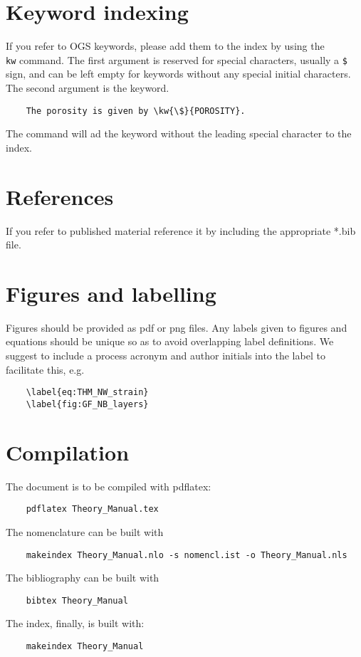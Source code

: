 \section{Keyword indexing}
If you refer to OGS keywords, please add them to the index by using the \texttt{\\kw} command. The first argument is reserved for special characters, usually a \texttt{\$} sign, and can be left empty for keywords without any special initial characters. The second argument is the keyword.
\begin{verbatim}
	The porosity is given by \kw{\$}{POROSITY}. 
\end{verbatim}
The command will ad the keyword without the leading special character to the index.

\section{References}
If you refer to published material reference it by including the appropriate *.bib file.

\section{Figures and labelling}
Figures should be provided as pdf or png files. Any labels given to figures and equations should be unique so as to avoid overlapping label definitions. We suggest to include a process acronym and author initials into the label to facilitate this, e.g.
\begin{verbatim}
	\label{eq:THM_NW_strain}
	\label{fig:GF_NB_layers}
\end{verbatim}

\section{Compilation}
The document is to be compiled with pdflatex:
\begin{verbatim}
	pdflatex Theory_Manual.tex
\end{verbatim}
The nomenclature can be built with
\begin{verbatim}
	makeindex Theory_Manual.nlo -s nomencl.ist -o Theory_Manual.nls
\end{verbatim}
The bibliography can be built with 
\begin{verbatim}
	bibtex Theory_Manual
\end{verbatim}
The index, finally, is built with:
\begin{verbatim}
	makeindex Theory_Manual
\end{verbatim}